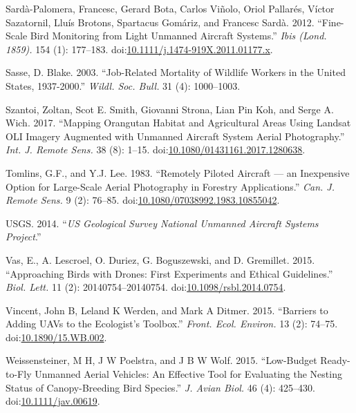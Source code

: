 \documentclass[]{interact}
\theoremstyle{plain}%
\theoremstyle{definition}
\theoremstyle{remark}
\begin{document}
\hypertarget{ref-sarda-palomera_fine-scale_2012}{}
Sardà-Palomera, Francesc, Gerard Bota, Carlos Viñolo, Oriol Pallarés,
Víctor Sazatornil, Lluís Brotons, Spartacus Gomáriz, and Francesc Sardà.
2012. ``Fine-Scale Bird Monitoring from Light Unmanned Aircraft
Systems.'' \emph{Ibis (Lond. 1859).} 154 (1): 177--183.
doi:\href{https://doi.org/10.1111/j.1474-919X.2011.01177.x}{10.1111/j.1474-919X.2011.01177.x}.

\hypertarget{ref-sasse_job-related_2003}{}
Sasse, D. Blake. 2003. ``Job-Related Mortality of Wildlife Workers in
the United States, 1937-2000.'' \emph{Wildl. Soc. Bull.} 31 (4):
1000--1003.

\hypertarget{ref-szantoi_mapping_2017}{}
Szantoi, Zoltan, Scot E. Smith, Giovanni Strona, Lian Pin Koh, and Serge
A. Wich. 2017. ``Mapping Orangutan Habitat and Agricultural Areas Using
Landsat OLI Imagery Augmented with Unmanned Aircraft System Aerial
Photography.'' \emph{Int. J. Remote Sens.} 38 (8): 1--15.
doi:\href{https://doi.org/10.1080/01431161.2017.1280638}{10.1080/01431161.2017.1280638}.

\hypertarget{ref-tomlins_remotely_1983}{}
Tomlins, G.F., and Y.J. Lee. 1983. ``Remotely Piloted Aircraft --- an
Inexpensive Option for Large-Scale Aerial Photography in Forestry
Applications.'' \emph{Can. J. Remote Sens.} 9 (2): 76--85.
doi:\href{https://doi.org/10.1080/07038992.1983.10855042}{10.1080/07038992.1983.10855042}.

\hypertarget{ref-USGS2014}{}
USGS. 2014. ``\emph{US Geological Survey National Unmanned Aircraft
Systems Project}.''

\hypertarget{ref-vas_approaching_2015}{}
Vas, E., A. Lescroel, O. Duriez, G. Boguszewski, and D. Gremillet. 2015.
``Approaching Birds with Drones: First Experiments and Ethical
Guidelines.'' \emph{Biol. Lett.} 11 (2): 20140754--20140754.
doi:\href{https://doi.org/10.1098/rsbl.2014.0754}{10.1098/rsbl.2014.0754}.

\hypertarget{ref-vincent_barriers_2015}{}
Vincent, John B, Leland K Werden, and Mark A Ditmer. 2015. ``Barriers to
Adding UAVs to the Ecologist's Toolbox.'' \emph{Front. Ecol. Environ.}
13 (2): 74--75.
doi:\href{https://doi.org/10.1890/15.WB.002}{10.1890/15.WB.002}.

\hypertarget{ref-weissensteiner_low-budget_2015}{}
Weissensteiner, M H, J W Poelstra, and J B W Wolf. 2015. ``Low-Budget
Ready-to-Fly Unmanned Aerial Vehicles: An Effective Tool for Evaluating
the Nesting Status of Canopy-Breeding Bird Species.'' \emph{J. Avian
Biol.} 46 (4): 425--430.
doi:\href{https://doi.org/10.1111/jav.00619}{10.1111/jav.00619}.
\end{document}
